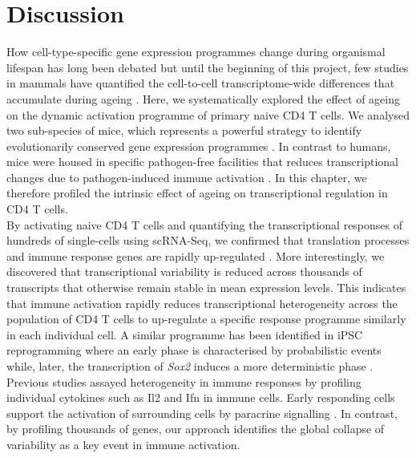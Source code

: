 
\section{Discussion}

How cell-type-specific gene expression programmes change during organismal lifespan has long been debated \citep{Bahar2006, Warren2007} but until the beginning of this project, few studies in mammals have quantified the cell-to-cell transcriptome-wide differences that accumulate during ageing \citep{Kowalczyk2015}. Here, we systematically explored the effect of ageing on the dynamic activation programme of primary naive CD4\plus{} T cells. We analysed two sub-species of mice, which represents a powerful strategy to identify evolutionarily conserved gene expression programmes \citep{Shay2013}. In contrast to humans, mice were housed in specific pathogen-free facilities that reduces transcriptional changes due to pathogen-induced immune activation \citep{Beura2016}. In this chapter, we therefore profiled the intrinsic effect of ageing on transcriptional regulation in CD4\plus{} T cells.\\

By activating naive CD4\plus{} T cells and quantifying the transcriptional responses of hundreds of single-cells using scRNA-Seq, we confirmed that translation processes and immune response genes are rapidly up-regulated \citep{Asmal2003, Neme2016, Turner2014, Glass2010, Gerondakis2010, Croft2009}. More interestingly, we discovered that transcriptional variability is reduced across thousands of transcripts that otherwise remain stable in mean expression levels. This indicates that immune activation rapidly reduces transcriptional heterogeneity across the population of CD4\plus{} T cells to up-regulate a specific response programme similarly in each individual cell. A similar programme has been identified in iPSC reprogramming where an early phase is characterised by probabilistic events while, later, the transcription of \textit{Sox2} induces a  more deterministic phase \citep{Buganim2012}. Previous studies assayed heterogeneity in immune responses by profiling individual cytokines such as Il2 and Ifn\textbeta{} in immune cells. Early responding cells support the activation of surrounding cells by paracrine signalling \citep{Fuhrmann2016, Shalek2014}. In contrast, by profiling thousands of genes, our approach identifies the global collapse of variability as a key event in immune activation.\\


